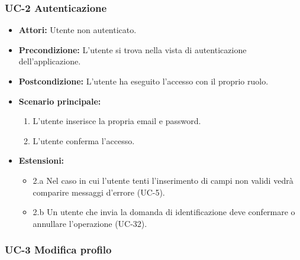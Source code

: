 \subsubsection{UC-2 Autenticazione}
		\begin{itemize}
			\item \textbf{Attori:} Utente non autenticato.
			\item \textbf{Precondizione:} L'utente si trova nella vista di autenticazione dell'applicazione.
			\item \textbf{Postcondizione:} L'utente ha eseguito l'accesso con il proprio ruolo.
			\item \textbf{Scenario principale:}
				\begin{enumerate}
					\item L'utente inserisce la propria email e password.
					\item L'utente conferma l'accesso.
				\end{enumerate}
				\item \textbf{Estensioni:}
				\begin{itemize}
					\item 2.a Nel caso in cui l'utente tenti l'inserimento di campi non validi vedrà comparire messaggi d'errore (UC-5).
					\item 2.b Un utente che invia la domanda di identificazione deve confermare o annullare l'operazione (UC-32).
				\end{itemize}
		\end{itemize}
		
	\subsubsection{UC-3 Modifica profilo}
	

